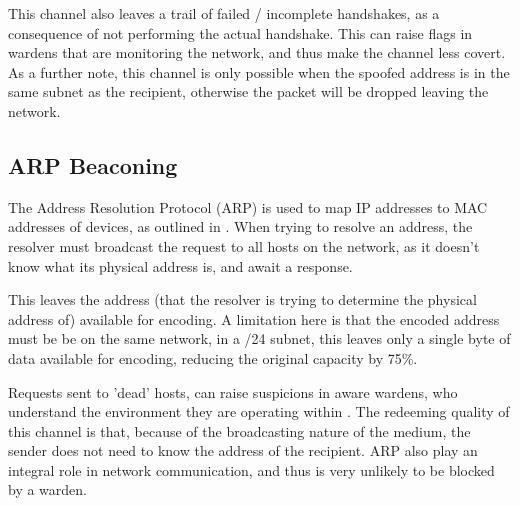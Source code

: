 This channel also leaves a trail of failed / incomplete handshakes, as a consequence of not performing the actual handshake. This can raise flags in wardens that are monitoring the network, and thus make the channel less covert. As a further note, this channel is only possible when the spoofed address is in the same subnet as the recipient, otherwise the packet will be dropped leaving the network. 

\subsection{ARP Beaconing}
\label{sec:ARP}

The Address Resolution Protocol (ARP) is used to map IP addresses to MAC addresses of devices, as outlined in \cite{Arfc826}. When trying to resolve an address, the resolver must broadcast the request to all hosts on the network, as it doesn't know what its physical address is, and await a response.

This leaves the address (that the resolver is trying to determine the physical address of) available for encoding. A limitation here is that the encoded address must be be on the same network, in a /24 subnet, this leaves only a single byte of data available for encoding, reducing the original capacity by 75\%.

Requests sent to 'dead' hosts, can raise suspicions in aware wardens, who understand the environment they are operating within \cite{CCUARP}. The redeeming quality of this channel is that, because of the broadcasting nature of the medium, the sender does not need to know the address of the recipient. ARP also play an integral role in network communication, and thus is very unlikely to be blocked by a warden.
